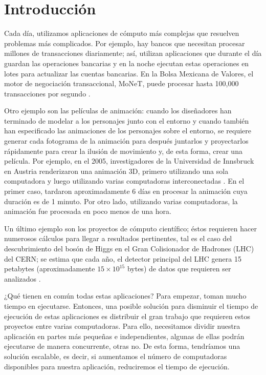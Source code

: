 \chapter{Introducción}
Cada día, utilizamos aplicaciones de cómputo más complejas que resuelven problemas más complicados. Por ejemplo, hay bancos que necesitan procesar millones de transacciones diariamente; así, utilizan aplicaciones que durante el día guardan las operaciones bancarias y en la noche ejecutan estas operaciones en lotes para actualizar las cuentas bancarias. En la Bolsa Mexicana de Valores, el motor de negociación transaccional, MoNeT, puede procesar hasta 100,000 transacciones por segundo \cite{bmv2012informe}. 

Otro ejemplo son las películas de animación: cuando los diseñadores han terminado de modelar a los personajes junto con el entorno y cuando también han especificado las animaciones de los personajes sobre el entorno, se requiere generar cada fotograma de la animación para después juntarlos y proyectarlos rápidamente para crear la ilusión de movimiento y, de esta forma, crear una película. Por ejemplo, en el 2005, investigadores de la Universidad de Innsbruck en Austria renderizaron una animación 3D, primero utilizando una sola computadora y luego utilizando varias computadoras interconectadas \cite{nerieri2005using}. En el primer caso, tardaron aproximadamente 6 días en procesar la animación cuya duración es de 1 minuto. Por otro lado, utilizando varias computadoras, la animación fue procesada en poco menos de una hora.

Un último ejemplo son los proyectos de cómputo científico; éstos requieren hacer numerosos cálculos para llegar a resultados pertinentes, tal es el caso del descubrimiento del bosón de Higgs en el Gran Colisionador de Hadrones (LHC) del CERN; se estima que cada año, el detector principal del LHC genera 15 petabytes (aproximadamente $15 \times 10^{15}$ bytes) de datos que requieren ser analizados \cite{shiers2007worldwide}. 

¿Qué tienen en común todas estas aplicaciones? Para empezar, toman mucho tiempo en ejecutarse. Entonces, una posible solución para disminuir el tiempo de ejecución de estas aplicaciones es distribuir el gran trabajo que requieren estos proyectos entre varias computadoras. Para ello, necesitamos dividir nuestra aplicación en partes más pequeñas e independientes, algunas de ellas podrán ejecutarse de manera concurrente, otras no. De esta forma, tendríamos una solución escalable, es decir, si aumentamos el número de computadoras disponibles para nuestra aplicación, reduciremos el tiempo de ejecución.

